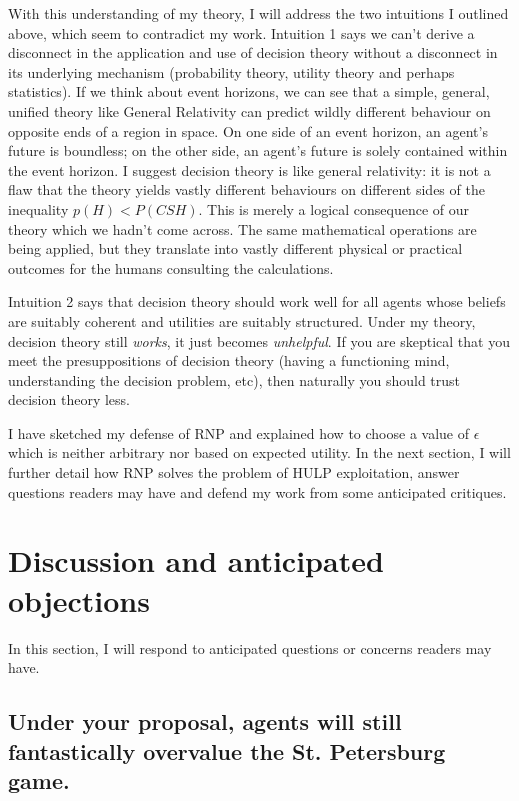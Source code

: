 \documentclass{article}
\begin{document}
With this understanding of my theory, I will address the two intuitions I outlined above, which seem to contradict my work. Intuition 1 says we can't derive a disconnect in the application and use of decision theory without a disconnect in its underlying mechanism (probability theory, utility theory and perhaps statistics). If we think about event horizons, we can see that a simple, general, unified theory like General Relativity can predict wildly different behaviour on opposite ends of a region in space. On one side of an event horizon, an agent's future is boundless; on the other side, an agent's future is solely contained within the event horizon. I suggest decision theory is like general relativity: it is not a flaw that the theory yields vastly different behaviours on different sides of the inequality \(p(H)<P(CSH)\). This is merely a logical consequence of our theory which we hadn't come across. The same mathematical operations are being applied, but they translate into vastly different physical or practical outcomes for the humans consulting the calculations.

Intuition 2 says that decision theory should work well for all agents whose beliefs are suitably coherent and utilities are suitably structured. Under my theory, decision theory still \textit{works}, it just becomes \textit{unhelpful}. If you are skeptical that you meet the presuppositions of decision theory (having a functioning mind, understanding the decision problem, etc), then naturally you should trust decision theory less.

I have sketched my defense of RNP and explained how to choose a value of \(\epsilon\) which is neither arbitrary nor based on expected utility. In the next section, I will further detail how RNP solves the problem of HULP exploitation, answer questions readers may have and defend my work from some anticipated critiques. 

\newpage\section{Discussion and anticipated objections}

In this section, I will respond to anticipated questions or concerns readers may have. 

\subsection{Under your proposal, agents will still fantastically overvalue the St. Petersburg game.} 
\end{document}
